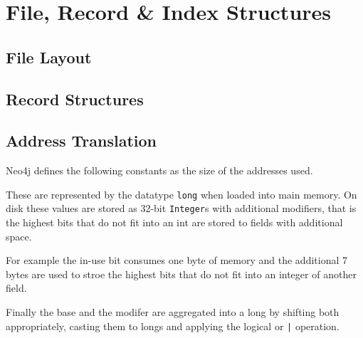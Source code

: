 \documentclass[a4paper,10pt]{article}
\begin{document}
\section{File, Record \& Index Structures}
\subsection{File Layout}
    
\subsection{Record Structures}
    \subsection{Address Translation}
    Neo4j defines the following constants as the size of the addresses used.
        \begin{figure}[H]\label{addrsize}
    \end{figure}
    These are represented by the datatype \texttt{long} when loaded into main memory. On disk these values are stored as 32-bit \texttt{Integer}s with additional modifiers, that is the highest bits that do not fit into an int are stored to fields with additional space.
    
    For example the in-use bit consumes one byte of memory and the additional 7 bytes are used to stroe the highest bits that do not fit into an integer of another field.
    
    Finally the base and the modifer are aggregated into a long by shifting both appropriately, casting them to longs and applying the logical or \texttt{|} operation.
    
    
\end{document}
